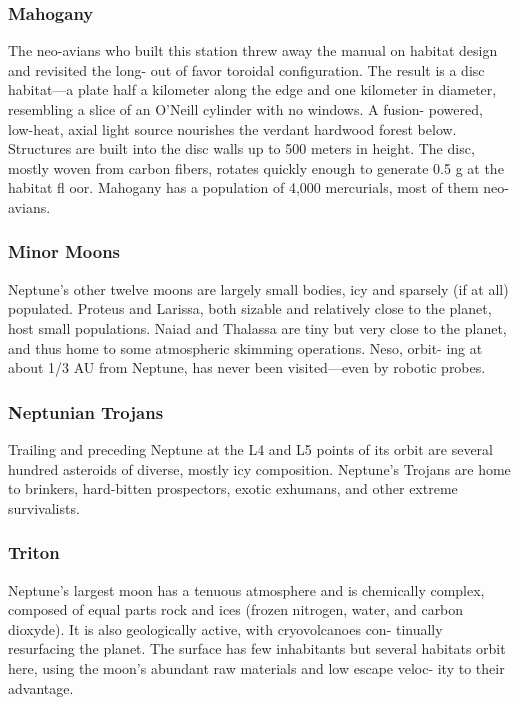\subsubsection{Mahogany}

The neo-avians who built this station threw away 
the manual on habitat design and revisited the long-
out of favor toroidal configuration. The result is a 
disc habitat—a plate half a kilometer along the edge 
and one kilometer in diameter, resembling a slice 
of an O'Neill cylinder with no windows. A fusion-
powered, low-heat, axial light source nourishes 
the verdant hardwood forest below. Structures are 
built into the disc walls up to 500 meters in height. 
The disc, mostly woven from carbon fibers, rotates 
quickly enough to generate 0.5 g at the habitat fl oor. 
Mahogany has a population of 4,000 mercurials, 
most of them neo-avians.

\subsubsection{Minor Moons}

Neptune's other twelve moons are largely small 
bodies, icy and sparsely (if at all) populated. Proteus 
and Larissa, both sizable and relatively close to the 
planet, host small populations. Naiad and Thalassa 
are tiny but very close to the planet, and thus home to 
some atmospheric skimming operations. Neso, orbit-
ing at about 1/3 AU from Neptune, has never been 
visited—even by robotic probes.

\subsubsection{Neptunian Trojans}

Trailing and preceding Neptune at the L4 and L5 
points of its orbit are several hundred asteroids of 
diverse, mostly icy composition. Neptune's Trojans 
are home to brinkers, hard-bitten prospectors, exotic 
exhumans, and other extreme survivalists.

\subsubsection{Triton}

Neptune's largest moon has a tenuous atmosphere and 
is chemically complex, composed of equal parts rock 
and ices (frozen nitrogen, water, and carbon dioxyde). 
It is also geologically active, with cryovolcanoes con-
tinually resurfacing the planet. The surface has few 
inhabitants but several habitats orbit here, using the 
moon's abundant raw materials and low escape veloc-
ity to their advantage.

